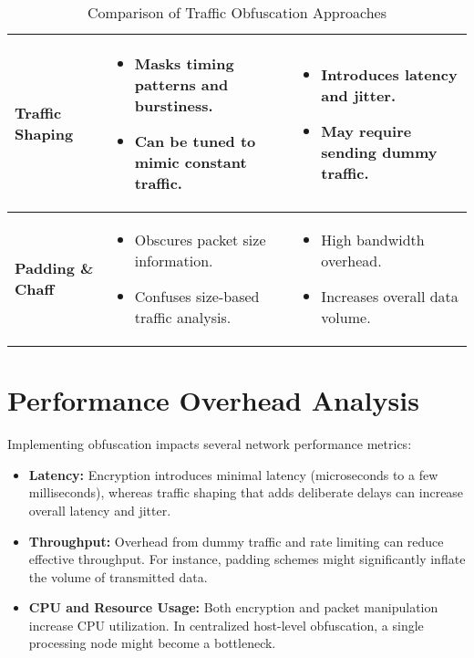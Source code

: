 \documentclass{article}
\begin{document}
\begin{table}[ht]
\begin{tabularx}{\linewidth}{|p{2.5cm}|X|X|}
\hline
\textbf{Traffic Shaping} & 
\begin{itemize}[leftmargin=*,noitemsep]
    \item Masks timing patterns and burstiness.
    \item Can be tuned to mimic constant traffic.
\end{itemize} & 
\begin{itemize}[leftmargin=*,noitemsep]
    \item Introduces latency and jitter.
    \item May require sending dummy traffic.
\end{itemize} \\
\hline
\textbf{Padding \& Chaff} & 
\begin{itemize}[leftmargin=*,noitemsep]
    \item Obscures packet size information.
    \item Confuses size-based traffic analysis.
\end{itemize} & 
\begin{itemize}[leftmargin=*,noitemsep]
    \item High bandwidth overhead.
    \item Increases overall data volume.
\end{itemize} \\
\hline
\end{tabularx}
\caption{Comparison of Traffic Obfuscation Approaches}
\label{tab:methods}
\end{table}

\section{Performance Overhead Analysis}
Implementing obfuscation impacts several network performance metrics:
\begin{itemize}[noitemsep]
    \item \textbf{Latency:} Encryption introduces minimal latency (microseconds to a few milliseconds), whereas traffic shaping that adds deliberate delays can increase overall latency and jitter.
    \item \textbf{Throughput:} Overhead from dummy traffic and rate limiting can reduce effective throughput. For instance, padding schemes might significantly inflate the volume of transmitted data.
    \item \textbf{CPU and Resource Usage:} Both encryption and packet manipulation increase CPU utilization. In centralized host-level obfuscation, a single processing node might become a bottleneck.
\end{itemize}
\end{document}
